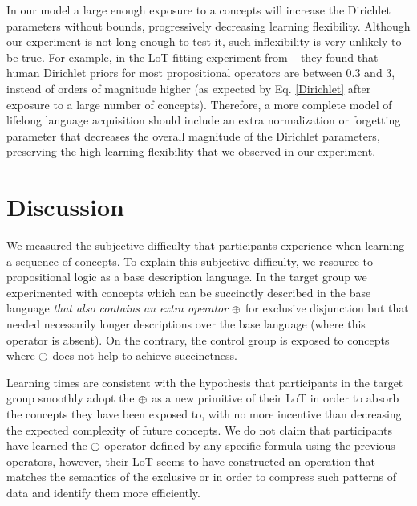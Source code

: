 In our model a large enough exposure to a concepts will increase the Dirichlet parameters without bounds, progressively decreasing learning flexibility. Although our experiment is not long enough to test it, such inflexibility is very unlikely to be true. For example, in the LoT fitting experiment from ~\cite{piantadosi2016logical} they found that human Dirichlet priors for most propositional operators are between 0.3 and 3, instead of orders of magnitude higher (as expected by Eq. \eqref{Dirichlet} after exposure to a large number of concepts). Therefore, a more complete model of lifelong language acquisition should include an extra normalization or forgetting parameter that decreases the overall magnitude of the Dirichlet parameters, preserving the high learning flexibility that we observed in our experiment.


\section{Discussion}

\par We measured the subjective difficulty that participants experience when learning a sequence of concepts. To explain this subjective difficulty, we resource to propositional logic as a  base description language. In the target group we experimented with concepts which can be succinctly described in the base language {\em that also contains an extra operator $\oplus$} for exclusive disjunction but that needed necessarily longer descriptions over the base language (where this operator is absent). On the contrary, the control group is exposed to concepts where $\oplus$ does not help to achieve succinctness.

Learning times are consistent with the hypothesis that participants in the target group smoothly adopt the $\oplus$ as a new primitive of their LoT in order to absorb the concepts they have been exposed to, with no more incentive than decreasing the expected complexity of future concepts. We do not claim that participants have learned the $\oplus$ operator defined by any specific formula using the previous operators, however, their LoT seems to have constructed an operation that matches the semantics of the exclusive or in order to compress such patterns of data and identify them more efficiently.

